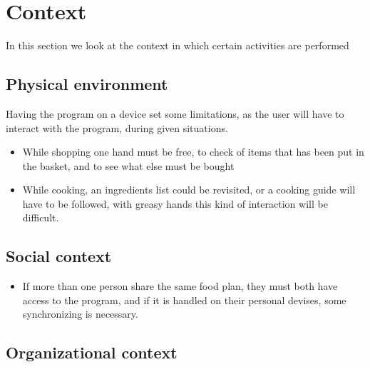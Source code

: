 \section{Context}
In this section we look at the context in which certain activities are performed
\subsection{Physical environment}
Having the program on a device set some limitations, as the user will have to interact with the program, during given situations.
\begin{itemize}
\item While shopping one hand must be free, to check of items that has been put in the basket, and to see what else must be bought
\item While cooking, an ingredients list could be revisited, or a cooking guide will have to be followed, with greasy hands this kind of interaction will be difficult.
\end{itemize}
\subsection{Social context}
\begin{itemize}
\item If more than one person share the same food plan, they must both have access to the program, and if it is handled on their personal devises, some synchronizing is necessary.
\end{itemize}
\subsection{Organizational context}

